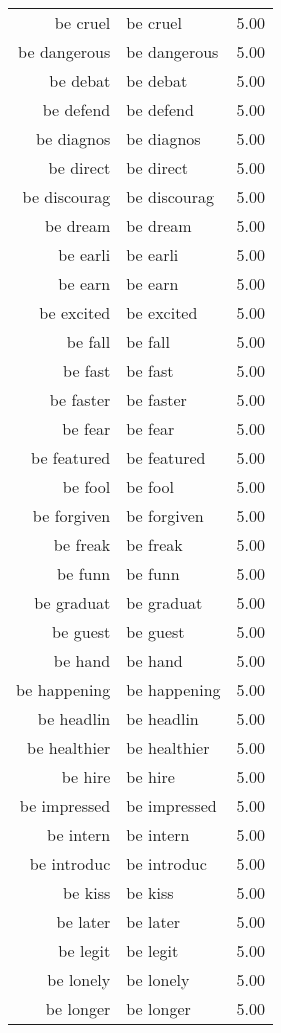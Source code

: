 \begin{table}[ht]
\begin{tabular}{rlr}
  be cruel & be cruel & 5.00 \\ 
  be dangerous & be dangerous & 5.00 \\ 
  be debat & be debat & 5.00 \\ 
  be defend & be defend & 5.00 \\ 
  be diagnos & be diagnos & 5.00 \\ 
  be direct & be direct & 5.00 \\ 
  be discourag & be discourag & 5.00 \\ 
  be dream & be dream & 5.00 \\ 
  be earli & be earli & 5.00 \\ 
  be earn & be earn & 5.00 \\ 
  be excited & be excited & 5.00 \\ 
  be fall & be fall & 5.00 \\ 
  be fast & be fast & 5.00 \\ 
  be faster & be faster & 5.00 \\ 
  be fear & be fear & 5.00 \\ 
  be featured & be featured & 5.00 \\ 
  be fool & be fool & 5.00 \\ 
  be forgiven & be forgiven & 5.00 \\ 
  be freak & be freak & 5.00 \\ 
  be funn & be funn & 5.00 \\ 
  be graduat & be graduat & 5.00 \\ 
  be guest & be guest & 5.00 \\ 
  be hand & be hand & 5.00 \\ 
  be happening & be happening & 5.00 \\ 
  be headlin & be headlin & 5.00 \\ 
  be healthier & be healthier & 5.00 \\ 
  be hire & be hire & 5.00 \\ 
  be impressed & be impressed & 5.00 \\ 
  be intern & be intern & 5.00 \\ 
  be introduc & be introduc & 5.00 \\ 
  be kiss & be kiss & 5.00 \\ 
  be later & be later & 5.00 \\ 
  be legit & be legit & 5.00 \\ 
  be lonely & be lonely & 5.00 \\ 
  be longer & be longer & 5.00 \\ 

\end{tabular}
\end{table}
